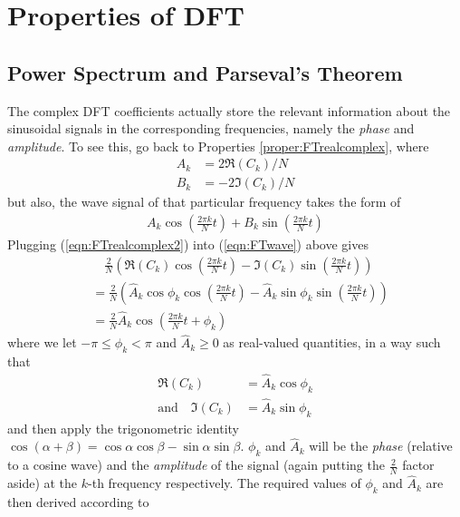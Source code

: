 \section{Properties of DFT}

\subsection{Power Spectrum and Parseval's Theorem}

The complex DFT coefficients actually store the relevant information about the sinusoidal signals in the corresponding frequencies, namely the \textit{phase} and \textit{amplitude}. To see this, go back to Properties \ref{proper:FTrealcomplex}, where
\begin{subequations}
\label{eqn:FTrealcomplex2}
\begin{align}
A_k &= 2\Re(C_k)/N \\
B_k &= -2\Im(C_k)/N 
\end{align}    
\end{subequations}
but also, the wave signal of that particular frequency takes the form of
\begin{align}
\label{eqn:FTwave}
A_k \cos(\frac{2\pi k}{N}t) + B_k \sin(\frac{2\pi k}{N}t)
\end{align}
Plugging (\ref{eqn:FTrealcomplex2}) into (\ref{eqn:FTwave}) above gives
\begin{align}
&\quad \frac{2}{N} \left(\Re(C_k)\cos(\frac{2\pi k}{N}t) - \Im(C_k) \sin(\frac{2\pi k}{N}t)\right) \nonumber \\
&= \frac{2}{N} \left(\hat{A}_k \cos \phi_k \cos(\frac{2\pi k}{N}t) - \hat{A}_k\sin\phi_k \sin(\frac{2\pi k}{N}t)\right) \nonumber  \\
&= \frac{2}{N} \hat{A}_k \cos(\frac{2\pi k}{N}t + \phi_k)
\end{align}
where we let $-\pi \leq \phi_k < \pi$ and $\hat{A}_k \geq 0$ as real-valued quantities, in a way such that 
\begin{subequations}
\begin{align}
\Re(C_k) &= \hat{A}_k \cos \phi_k \\
\text{and} \quad \Im(C_k) &= \hat{A}_k \sin \phi_k   
\end{align}   
\end{subequations}
and then apply the trigonometric identity $\cos(\alpha + \beta) = \cos\alpha \cos\beta - \sin\alpha \sin\beta$. $\phi_k$ and $\hat{A}_k$ will be the \textit{phase} (relative to a cosine wave) and the \textit{amplitude} of the signal (again putting the $\frac{2}{N}$ factor aside) at the $k$-th frequency respectively. The required values of $\phi_k$ and $\hat{A}_k$ are then derived according to
